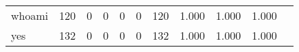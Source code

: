 \begin{longtable}{lp{1.10cm}p{1.10cm}p{1.10cm}p{1.10cm}p{1.10cm}p{1.10cm}p{1.10cm}p{1.10cm}p{1.10cm}p{1.10cm}}
whoami    &                    120 &                                  0 &                                 0 &                                0 &                                 0 &                             120 &                             1.000 &                                 1.000 &                               1.000 \\
yes       &                    132 &                                  0 &                                 0 &                                0 &                                 0 &                             132 &                             1.000 &                                 1.000 &                               1.000 \\
\end{longtable}
